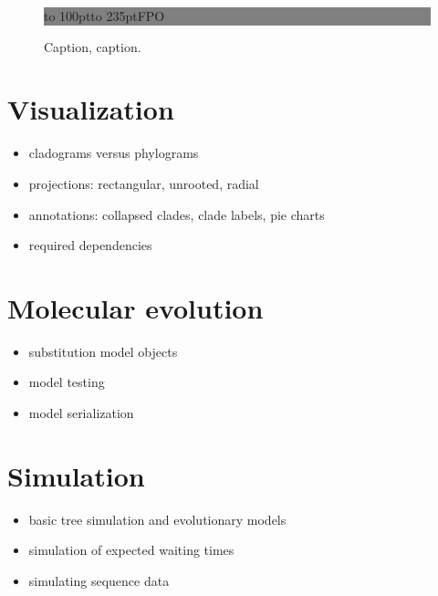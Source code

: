 \documentclass{bioinfo}
\begin{document}
\begin{figure}[!tpb]%
\fboxsep=0pt\colorbox{gray}{\begin{minipage}[t]{235pt} \vbox to 100pt{\vfill\hbox to
235pt{\hfill\fontsize{24pt}{24pt}\selectfont FPO\hfill}\vfill}
\end{minipage}}
\caption{Caption, caption.}\label{fig:01}
\end{figure}


\section{Visualization}

\begin{itemize}
\item cladograms versus phylograms
\item projections: rectangular, unrooted, radial
\item annotations: collapsed clades, clade labels, pie charts
\item required dependencies
\end{itemize}

\section{Molecular evolution}

\begin{itemize}
\item substitution model objects
\item model testing
\item model serialization
\end{itemize}

\section{Simulation}

\begin{itemize}
\item basic tree simulation and evolutionary models
\item simulation of expected waiting times
\item simulating sequence data
\end{itemize}
\end{document}

